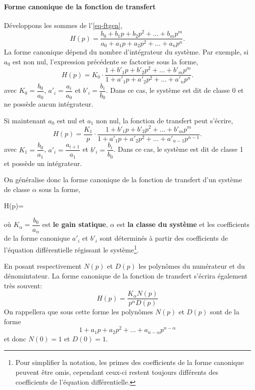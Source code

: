 \paragraph{Forme canonique de la fonction de transfert}
Développons les sommes de l'\cref{eq-ftgen},
$$
H(p)=\dfrac{b_0+b_1p+b_2p^2+\ldots+b_mp^m}{a_0+a_1p+a_2p^2+\ldots+a_np^n}.
$$
La forme canonique dépend du nombre d'intégrateur du système. 
Par exemple, si $a_0$ est non nul, l'expression précédente se factorise sous la forme,
$$
H(p)=K_0\cdot\dfrac{1+b'_1p+b'_2p^2+\ldots+b'_mp^m}{1+a'_1p+a'_2p^2+\ldots+a'_np^n}.
$$
avec $K_0=\dfrac{b_0}{a_0}$, $a'_i=\dfrac{a_i}{a_0}$ et $b'_i=\dfrac{b_i}{b_0}$. 
Dans ce cas, le système est dit de classe 0 et ne possède aucun intégrateur.

Si maintenant $a_0$ est nul et $a_1$ non nul, la fonction de transfert peut s'écrire,
$$
H(p)=\dfrac{K_1}{p}\cdot\dfrac{1+b'_1p+b'_2p^2+\ldots+b'_mp^m}{1+a'_1p+a'_2p^2+\ldots+a'_{n-1}p^{n-1}}.
$$
avec $K_1=\dfrac{b_0}{a_1}$, $a'_i=\dfrac{a_{i+1}}{a_1}$ et $b'_i=\dfrac{b_i}{b_0}$.
Dans ce cas, le système est dit de classe 1 et possède un intégrateur.

On généralise donc la forme canonique de la fonction de transfert d'un système de classe $\alpha$ sous la forme,
\begin{bequation}
H(p)=\cdot{} \label{eq-ftcan} 
\end{bequation}
où $K_\alpha=\dfrac{b_0}{a_\alpha}$ est \textbf{le gain statique}, $\alpha$ est \textbf{la classe du système} 
et les coefficients de la forme canonique $a'_i$ et $b'_i$ sont déterminés à partir des coefficients 
de l'équation différentielle régissant le système\footnote{Pour simplifier la notation, 
les primes des coefficients de la forme canonique peuvent être omis, cependant 
ceux-ci restent toujours différents des coefficients de l'équation différentielle.}.

En posant respectivement $N(p)$ et $D(p)$ les polynômes du numérateur et du dénomintateur.
La forme canonique de la fonction de transfert s'écrira également très souvent:
$$
H(p)=\dfrac{K_\alpha N(p)}{p^\alpha D(p)}
$$
On rappellera que sous cette forme les polynômes $N(p)$ et $D(p)$ sont de la forme 
$$
1+a_1p+a_2p^2+\ldots+a_{n-\alpha}p^{n-\alpha}
$$
et donc $N(0)=1$ et $D(0)=1$.


